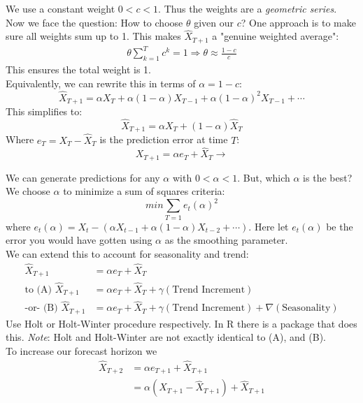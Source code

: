 We use a constant weight $0<c<1$. Thus the weights are a \textit{geometric series}. Now we face the question: How to choose $\theta$ given our $c$? One approach is to make sure all weights sum up to 1. This makes $\hat{X}_{T+1}$ a "genuine weighted average":
\begin{align*}
    \theta \sum_{k=1}^T c^k =1 \Rightarrow \theta \approx \frac{1-c}{c}
\end{align*}
This ensures the total weight is 1. \\


Equivalently, we can rewrite this in terms of $\alpha=1-c$:
\[
        \hat{X}_{T+1}= \alpha X_T+\alpha(1-\alpha)X_{T-1}+\alpha(1-\alpha)^2 X_{T-1}+\cdots 
\]
This simplifies to:
\[
        \hat{X}_{T+1}=\alpha X_T+(1-\alpha)\hat{X}_T\]
Where $e_T=X_T-\hat{X}_T$ is the prediction error at time $T$:\[
        X_{T+1}=\alpha e_T + \hat{X}_T \rightarrow \]

We can generate predictions for any $\alpha$ with $0<\alpha<1$. But, which $\alpha$ is the best? We choose $\alpha$ to minimize a sum of squares criteria:
\[min \sum_{T=1}e_t (\alpha)^2\] 
where $e_t(\alpha)=X_t-(\alpha X_{t-1}+ \alpha(1-\alpha)X_{t-2} +\cdots) $. Here let $e_t(\alpha)$ be the error you would have gotten using $\alpha$ as the smoothing parameter.\\

We can extend this to account for seasonality and trend:
\begin{align*}
            \hat{X}_{T+1} &= \alpha e_T+\hat{X}_T\\
            \text{to (A) } \hat{X}_{T+1}&= \alpha e_T+\hat{X}_T+\gamma(\text{Trend Increment}) \\
            \text{-or- (B) } \hat{X}_{T+1}&= \alpha e_T+\hat{X}_T+\gamma(\text{Trend Increment}) + \nabla(\text{Seasonality})
        \end{align*} 
        Use Holt or Holt-Winter procedure respectively. In R there is a package that does this. \textit{Note}: Holt and Holt-Winter are not exactly identical to (A), and (B).\\


To increase our forecast horizon we  
    \begin{align*}
        \hat{X}_{T+2} &= \alpha e_{T+1} + \hat{X}_{T+1}\\
        &= \alpha(X_{T+1}-\hat{X}_{T+1})+\hat{X}_{T+1}
    \end{align*}







